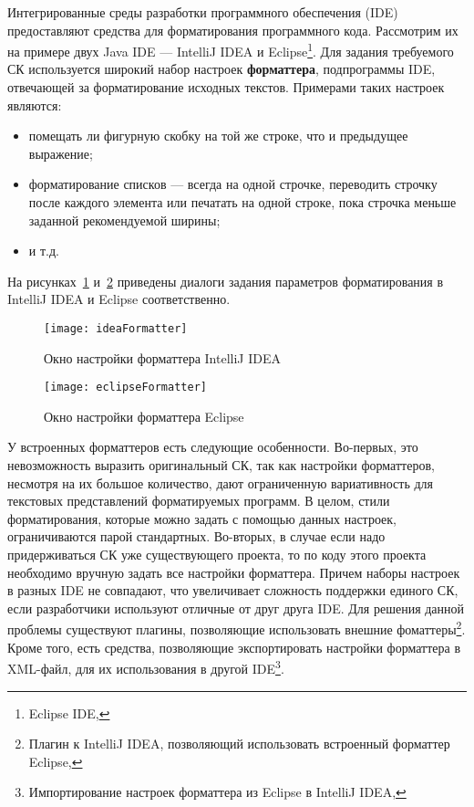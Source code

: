 Интегрированные среды разработки программного обеспечения
(IDE) предоставляют средства
для форматирования программного кода. Рассмотрим их на примере двух Java IDE ---
IntelliJ IDEA и Eclipse\footnote{Eclipse IDE, }.
Для задания требуемого СК используется широкий набор настроек \textbf{форматтера},
подпрограммы IDE, отвечающей за форматирование исходных текстов.
Примерами таких настроек являются:
\begin{itemize}
  \item помещать ли фигурную скобку на той же строке, что и
    предыдущее выражение;
  \item форматирование списков --- всегда на одной строчке, переводить строчку после
    каждого элемента или печатать на одной строке,
    пока строчка меньше заданной рекомендуемой ширины;
  \item и т.д.
\end{itemize}
На рисунках~\ref{fig:ideaFormatter} и~\ref{fig:eclipseFormatter} приведены диалоги задания
параметров форматирования в IntelliJ IDEA и Eclipse соответственно.

\begin{figure}[p]
	\centering
	\texttt{[image: ideaFormatter]}
	\caption{Окно настройки форматтера IntelliJ IDEA}
	\label{fig:ideaFormatter}
\end{figure}

\begin{figure}[p]
	\centering
	\texttt{[image: eclipseFormatter]}
	\caption{Окно настройки форматтера Eclipse}
	\label{fig:eclipseFormatter}
\end{figure}

У встроенных форматтеров есть следующие особенности.
Во-первых, это невозможность выразить
оригинальный СК, так как настройки форматтеров, несмотря на их большое
количество,
дают ограниченную вариативность для текстовых представлений форматируемых
программ. В целом,
стили форматирования, которые можно задать с помощью данных настроек,
ограничиваются парой стандартных.
Во-вторых, в случае если надо
придерживаться СК уже существующего проекта, то по коду этого проекта необходимо
вручную задать все настройки форматтера.
Причем наборы настроек в разных IDE не совпадают, что увеличивает сложность
поддержки единого СК, если разработчики используют отличные от друг друга IDE.
Для решения данной проблемы существуют плагины, позволяющие использовать
внешние фоматтеры\footnote{Плагин к IntelliJ IDEA, позволяющий использовать
встроенный форматтер Eclipse, }.
Кроме того, есть средства, позволяющие экспортировать настройки форматтера в
XML-файл, для их использования в другой
IDE\footnote{Импортирование настроек форматтера из Eclipse в IntelliJ IDEA,
}.

